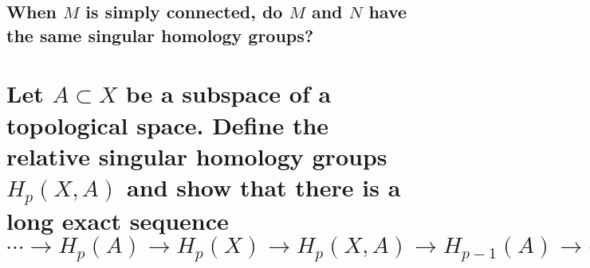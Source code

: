 \documentclass[10pt]{article}
\begin{document}
\subsection{When $M$ is simply connected, do $M$ and $N$ have the same singular homology groups?}

\section{Let $A \subset X$ be a subspace of a topological space. Define the relative singular
  homology groups $H_p(X,A)$ and show that there is a long exact sequence
  $$\cdots \to H_p(A) \to H_p(X) \to H_p(X,A) \to H_{p-1}(A) \to \cdots$$}
\end{document}
